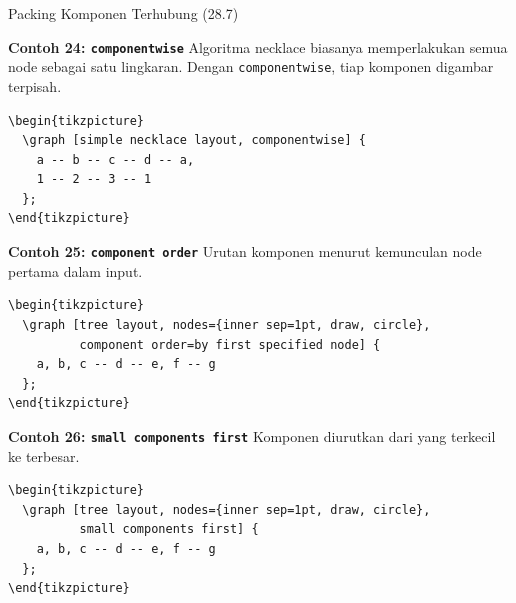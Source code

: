 \documentclass[aspectratio=169]{beamer}
\begin{document}
\begin{frame}{Packing Komponen Terhubung (28.7)}


\textbf{Contoh 24: \texttt{componentwise}}
Algoritma necklace biasanya memperlakukan semua node sebagai satu lingkaran. Dengan \texttt{componentwise}, tiap komponen digambar terpisah.
\begin{lstlisting}
\begin{tikzpicture}
  \graph [simple necklace layout, componentwise] {
    a -- b -- c -- d -- a,
    1 -- 2 -- 3 -- 1
  };
\end{tikzpicture}
\end{lstlisting}
\begin{center}\end{center}


\textbf{Contoh 25: \texttt{component order}}
Urutan komponen menurut kemunculan node pertama dalam input.
\begin{lstlisting}
\begin{tikzpicture}
  \graph [tree layout, nodes={inner sep=1pt, draw, circle},
          component order=by first specified node] {
    a, b, c -- d -- e, f -- g
  };
\end{tikzpicture}
\end{lstlisting}
\begin{center}\end{center}


\textbf{Contoh 26: \texttt{small components first}}
Komponen diurutkan dari yang terkecil ke terbesar.
\begin{lstlisting}
\begin{tikzpicture}
  \graph [tree layout, nodes={inner sep=1pt, draw, circle},
          small components first] {
    a, b, c -- d -- e, f -- g
  };
\end{tikzpicture}
\end{lstlisting}
\begin{center}\end{center}



\end{frame}
\end{document}
